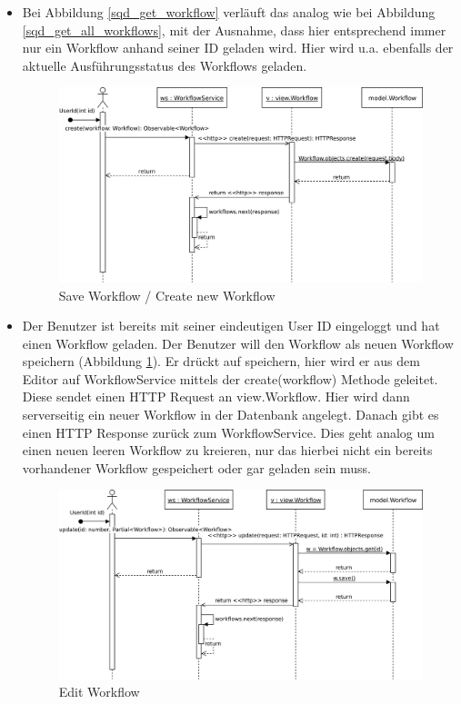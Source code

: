 \begin{itemize}
    \item     
    Bei Abbildung \ref{sqd_get_workflow} verläuft das analog wie bei Abbildung  \ref{sqd_get_all_workflows}, mit der Ausnahme, dass hier entsprechend immer nur ein Workflow anhand seiner ID geladen wird. Hier wird u.a. ebenfalls der aktuelle Ausführungsstatus des Workflows geladen.\newline\newline
   
    \begin{figure}[H]
        \centering
        \includegraphics[width=15cm]{images/sqd_save_workflow.jpeg}
        \caption{Save Workflow / Create new Workflow}
        \label{sqd_save_workflow}
    \end{figure}

    \item Der Benutzer ist bereits mit seiner eindeutigen User ID eingeloggt und hat einen Workflow geladen. Der Benutzer will den Workflow als neuen Workflow speichern (Abbildung \ref{sqd_save_workflow}). Er drückt auf \grqq{}speichern\grqq{}, hier wird er aus dem Editor auf WorkflowService mittels der create(workflow) Methode geleitet. Diese sendet einen HTTP Request an view.Workflow. Hier wird dann serverseitig ein neuer Workflow in der Datenbank angelegt. Danach gibt es einen HTTP Response zurück zum WorkflowService. Dies geht analog um einen neuen leeren Workflow zu kreieren, nur das hierbei nicht ein bereits vorhandener Workflow gespeichert oder gar geladen sein muss. \newline\newline
    
    \begin{figure}[H]
        \centering
        \includegraphics[width=15cm]{images/sqd_edit_workflow.jpg}
        \caption{Edit Workflow}
        \label{sqd_edit_workflow}
    \end{figure}
    

\end{itemize}
